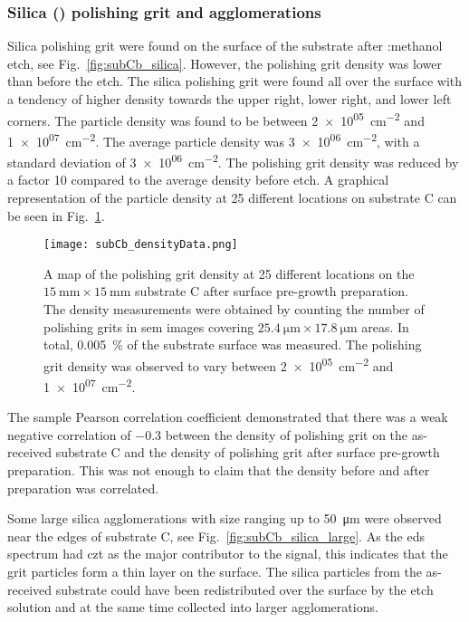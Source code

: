 \subsubsection{Silica () polishing grit and agglomerations}

Silica polishing grit were found on the surface of the substrate after :methanol etch, see Fig.~\ref{fig:subCb_silica}. However, the polishing grit density was lower than before the etch. The silica polishing grit were found all over the surface with a tendency of higher density towards the upper right, lower right, and lower left corners. The particle density was found to be between \SI{2e+05}{\centi\metre^{-2}} and \SI{1e+07}{\centi\metre^{-2}}. The average particle density was \SI{3e+06}{\centi\metre^{-2}}, with a standard deviation of \SI{3e+06}{\centi\metre^{-2}}. The polishing grit density was reduced by a factor 10 compared to the average density before etch. A graphical representation of the particle density at 25 different locations on substrate C can be seen in Fig.~\ref{fig:subCb_densityData}. 

\begin{figure}[htbp]
    \centering
    \texttt{[image: subCb\_densityData.png]}
    \caption[Map of the polishing grit density on substrate C after surface pre-growth preparation.]{A map of the polishing grit density at 25 different locations on the $\SI{15}{\milli\metre}\times\SI{15}{\milli\metre}$ substrate C after surface pre-growth preparation. The density measurements were obtained by counting the number of polishing grits in \ac{sem} images covering $\SI{25.4}{\micro\metre}\times\SI{17.8}{\micro\metre}$ areas. In total, \SI{0.005}{\percent} of the substrate surface was measured. The polishing grit density was observed to vary between \SI{2e+05}{\centi\metre^{-2}} and \SI{1e+07}{\centi\metre^{-2}}.}
    \label{fig:subCb_densityData}
\end{figure}

The sample Pearson correlation coefficient demonstrated that there was a weak negative correlation of \SI{-0.3}{} between the density of polishing grit on the as-received substrate C and the density of polishing grit after surface pre-growth preparation. This was not enough to claim that the density before and after preparation was correlated.

Some large silica agglomerations with size ranging up to \SI{50}{\micro\metre} were observed near the edges of substrate C, see Fig.~\ref{fig:subCb_silica_large}. As the \ac{eds} spectrum had \ac{czt} as the major contributor to the signal, this indicates that the grit particles form a thin layer on the surface. The silica particles from the as-received substrate could have been redistributed over the surface by the etch solution and at the same time collected into larger agglomerations.

